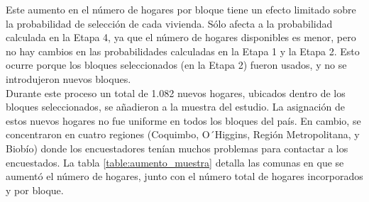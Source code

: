\documentclass[12pt]{report}
\begin{document}
Este aumento en el número de hogares por bloque tiene un efecto limitado sobre la probabilidad de selección de cada vivienda. Sólo afecta a la probabilidad calculada en la Etapa 4, ya que el número de hogares disponibles es menor, pero no hay cambios en las probabilidades calculadas en la Etapa 1 y la Etapa 2. Esto ocurre porque los bloques seleccionados (en la Etapa 2) fueron usados, y no se introdujeron nuevos bloques.\\

Durante este proceso un total de 1.082 nuevos hogares, ubicados dentro de los bloques seleccionados, se añadieron a la muestra del estudio. La asignación de estos nuevos hogares no fue uniforme en todos los bloques del país. En cambio, se concentraron en cuatro regiones (Coquimbo, O´Higgins, Región Metropolitana, y Biobío) donde los encuestadores tenían muchos problemas para contactar a los encuestados. La tabla \ref{table:aumento_muestra} detalla las comunas en que se aumentó el número de hogares, junto con el número total de hogares incorporados y por bloque. \\
\end{document}
